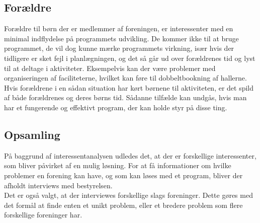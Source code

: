 \subsection*{Forældre}
Forældre til børn der er medlemmer af foreningen, er interessenter med en minimal indflydelse på programmets udvikling. De kommer ikke til at bruge programmet, de vil dog kunne mærke programmets virkning, især hvis der tidligere er sket fejl i planlægningen, og det så går ud over forældrenes tid og lyst til at deltage i aktiviteter. Eksempelvis kan der være problemer med organiseringen af faciliteterne, hvilket kan føre til dobbeltbookning af hallerne. Hvis forældrene i en sådan situation har kørt børnene til aktiviteten, er det spild af både forældrenes og deres børns tid. Sådanne tilfælde kan undgås, hvis man har et fungerende og effektivt program, der kan holde styr på disse ting.

\subsection*{Opsamling}
På baggrund af interessentanalysen udledes det, at der er forskellige interessenter, som bliver påvirket af en mulig løsning. For at få informationer om hvilke problemer en forening kan have, og som kan løses med et program, bliver der afholdt interviews med bestyrelsen. \\
Det er også valgt, at der interviewes forskellige slags foreninger. Dette gøres med det formål at finde enten et unikt problem, eller et bredere problem som flere forskellige foreninger har.\\

